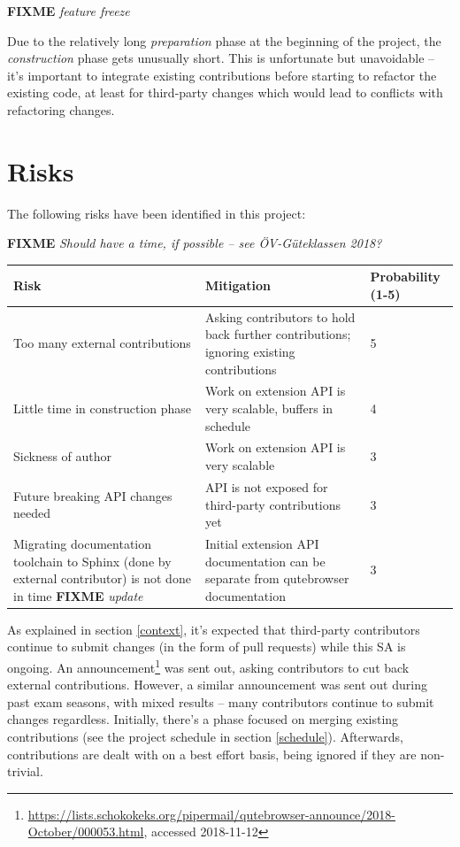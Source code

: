 \documentclass[a4paper,parskip=full,DIV=14,BCOR=15mm]{scrreprt}
\newcommand{\fixme}[1]{\textbf{FIXME} \emph{#1}}
\begin{document}
\fixme{feature freeze}

Due to the relatively long \emph{preparation} phase at the beginning of the
project, the \emph{construction} phase gets unusually short. This is
unfortunate but unavoidable -- it's important to integrate existing
contributions before starting to refactor the existing code, at least for
third-party changes which would lead to conflicts with refactoring changes.

\section{Risks}
The following risks have been identified in this project:

\fixme{Should have a time, if possible -- see ÖV-Güteklassen 2018?}

\begin{table}[h!]
  \begin{tabulary}{\linewidth}{LLL}
    \toprule
    Risk & Mitigation & Probability (1-5) \\
    \midrule
    Too many external contributions & Asking contributors to hold back further contributions; ignoring existing contributions & 5 \\
    \hline
    Little time in construction phase & Work on extension API is very
    scalable, buffers in schedule & 4 \\
    \hline
    Sickness of author & Work on extension API is very scalable & 3 \\
    \hline
    Future breaking API changes needed & API is not exposed for third-party
    contributions yet & 3 \\
    \hline
    Migrating documentation toolchain to Sphinx (done by external contributor)
    is not done in time \fixme{update }& Initial extension API documentation can be separate from
    qutebrowser documentation & 3 \\
    \bottomrule
  \end{tabulary}
\end{table}

As explained in section \ref{context}, it's expected that third-party
contributors continue to submit changes (in the form of pull requests) while
this SA is ongoing. An
announcement\footnote{\url{https://lists.schokokeks.org/pipermail/qutebrowser-announce/2018-October/000053.html},
  accessed 2018-11-12} was sent out, asking contributors to cut back external
contributions. However, a similar announcement was sent out during past exam
seasons, with mixed results -- many contributors continue to submit changes
regardless. Initially, there's a phase focused on merging existing
contributions (see the project schedule in section \ref{schedule}). Afterwards,
contributions are dealt with on a best effort basis, being ignored if they
are non-trivial.
\end{document}
